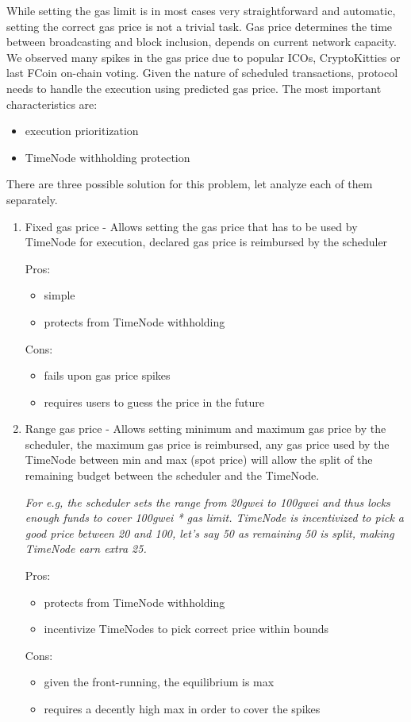 \documentclass{article}
\begin{document}
{  While setting the gas limit is in most cases very straightforward and automatic, setting the correct gas price is not a trivial task. Gas price determines the time between broadcasting and block inclusion, depends on current network capacity. We observed many spikes in the gas price due to popular ICOs, CryptoKitties or last FCoin on-chain voting.
Given the nature of scheduled transactions, protocol needs to handle the execution using predicted gas price. The most important characteristics are:
  \begin{itemize}
    \item execution prioritization
    \item TimeNode withholding protection
  \end{itemize}

  There are three possible solution for this problem, let analyze each of them separately.

  \begin{enumerate}
    \item 
      Fixed gas price - Allows setting the gas price that has to be used by TimeNode for execution, declared gas price is reimbursed by the scheduler
      
      Pros:
      \begin{itemize}
        \item simple
        \item protects from TimeNode withholding 
      \end{itemize}
      Cons:
      \begin{itemize}
        \item fails upon gas price spikes
        \item requires users to guess the price in the future
      \end{itemize}

    \item 
      Range gas price - Allows setting minimum and maximum gas price by the scheduler, the maximum gas price is reimbursed, any gas price used by the TimeNode between min and max (spot price) will allow the split of the remaining budget between the scheduler and the TimeNode.

      \textit{For e.g, the scheduler sets the range from 20gwei to 100gwei and thus locks enough funds to cover 100gwei * gas limit. TimeNode is incentivized to pick a good price between 20 and 100, let’s say 50 as remaining 50 is split, making TimeNode earn extra 25.}

      Pros:
      \begin{itemize}
        \item protects from TimeNode withholding
        \item incentivize TimeNodes to pick correct price within bounds 
      \end{itemize}
      Cons:
      \begin{itemize}
        \item given the front-running, the equilibrium is max
        \item requires a decently high max in order to cover the spikes
      \end{itemize}


\end{enumerate}}
\end{document}
